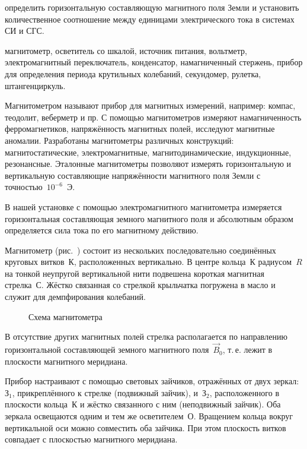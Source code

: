 
\begin{lab:aim}
    определить горизонтальную составляющую магнитного поля Земли и установить
количественное соотношение между единицами электрического тока в системах СИ и
СГС.
\end{lab:aim}

\begin{lab:equipment}
    магнитометр, осветитель со шкалой, источник питания, вольтметр,
электромагнитный переключатель, конденсатор, намагниченный стержень, прибор для
определения периода крутильных колебаний, секундомер, рулетка, штангенциркуль.
\end{lab:equipment}

Магнитометром называют прибор для магнитных измерений, например: компас,
теодолит, веберметр и пр. С помощью
магнитометров измеряют намагниченность ферромагнетиков, напряжённость магнитных
полей, исследуют магнитные аномалии.
Разработаны магнитометры различных конструкций: магнитостатические,
электромагнитные, магнитодинамические, индукционные,
резонансные. Эталонные магнитометры позволяют измерять горизонтальную и
вертикальную составляющие напряжённости
магнитного поля Земли с точностью~$10^{-6}$~Э.

В нашей установке с помощью электромагнитного магнитометра измеряется
горизонтальная составляющая земного магнитного
поля и абсолютным образом определяется сила тока по его магнитному действию.

\experiment

Магнитометр (рис.~) состоит из нескольких
последовательно соединённых круговых витков~К, расположенных
вертикально. В центре кольца~К радиусом~$R$
на тонкой неупругой вертикальной нити подвешена
короткая магнитная стрелка~С. Жёстко связанная со стрелкой крыльчатка погружена
в масло и служит для демпфирования колебаний.

\begin{figure}[h!]
    \centering
    \caption{Схема магнитометра}
\end{figure}

В отсутствие других магнитных полей стрелка располагается по направлению
горизонтальной составляющей земного магнитного
поля~$\vec{B}_0$, т.\,е. лежит в плоскости магнитного меридиана.

Прибор настраивают с помощью световых зайчиков, отражённых от двух зеркал:~$З_1$,
прикреплённого к стрелке (подвижный зайчик), и~$З_2$, расположенного в плоскости
кольца~К и жёстко связанного с ним (неподвижный зайчик). Оба зеркала
освещаются одним и тем же осветителем~О. Вращением кольца вокруг вертикальной
оси можно совместить оба зайчика. При этом плоскость витков совпадает
с плоскостью магнитного меридиана.

